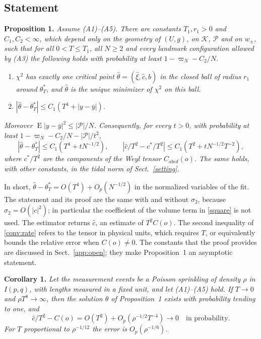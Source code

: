 \subsection{Statement}
\noindent\textbf{Proposition 1.} \emph{Assume (A1)--(A5). There are
constants $T_1,r_1>0$ and $C_1,C_2<\infty$, which depend only on the
geometry of $(U,g)$, on $\mathcal K$, $\mathcal P$ and on $w_\pm$, such that
for all $0<T\le T_1$, all $N\ge2$ and every landmark configuration allowed
by (A3) the following holds with probability at least $1-\varpi_N-C_2/N$.}
\begin{enumerate}
\item[(i)] \emph{$\chi^2$ has exactly one critical point
$\hat\theta=(\hat\xi,\hat c,\hat b)$ in the closed ball of radius $r_1$
around $\theta^*_T$, and $\hat\theta$ is the unique minimizer of $\chi^2$
on this ball.}
\item[(ii)] \emph{$|\hat\theta-\theta^*_T|\le C_1\left(T^4+|y-\bar y|\right)$.}
\end{enumerate}
\emph{Moreover $\operatorname{E}|y-\bar y|^2\le|\mathcal P|/N$. Consequently,
for every $t>0$, with probability at least
$1-\varpi_N-C_2/N-|\mathcal P|/t^2$,}
\begin{equation}
 |\hat\theta-\theta^*_T|\le C_1\left(T^4+tN^{-1/2}\right),\qquad
 \left|\hat c/T^2-c^*/T^2\right|\le C_1\left(T^2+tN^{-1/2}T^{-2}\right),
 \label{conv:rate}
\end{equation}
\emph{where $c^*/T^2$ are the components of the Weyl tensor $C_{abcd}(o)$.
The same holds, with other constants, in the tidal norm of
Sect.~\ref{setting}.}

\medskip
In short, $\hat\theta-\theta^*_T=O(T^4)+O_p(N^{-1/2})$ in the normalized
variables of the fit. The statement and its proof are the same with and
without $\sigma_2$, because $\sigma_2=O(|c|^2)$; in particular the
coefficient of the volume term in \eqref{square} is not used. The estimator
returns $\hat c$, an estimate of $T^2C(o)$. The second inequality of
\eqref{conv:rate} refers to the tensor in physical units, which requires
$T$, or equivalently bounds the relative error when $C(o)\neq0$. The
constants that the proof provides are discussed in Sect.~\ref{app:open};
they make Proposition~1 an asymptotic statement.

\medskip
\noindent\textbf{Corollary 1.} \emph{Let the measurement events be a
Poisson sprinkling of density $\rho$ in $I(p,q)$, with lengths measured in
a fixed unit, and let (A1)--(A5) hold. If $T\to0$ and $\rho T^8\to\infty$,
then the solution $\hat\theta$ of Proposition~1 exists with probability
tending to one, and}
\begin{equation}
 \hat c/T^2-C(o)=O(T^2)+O_p\!\left(\rho^{-1/2}T^{-4}\right)\to0
 \quad\text{in probability}.
\end{equation}
\emph{For $T$ proportional to $\rho^{-1/12}$ the error is
$O_p(\rho^{-1/6})$.}

